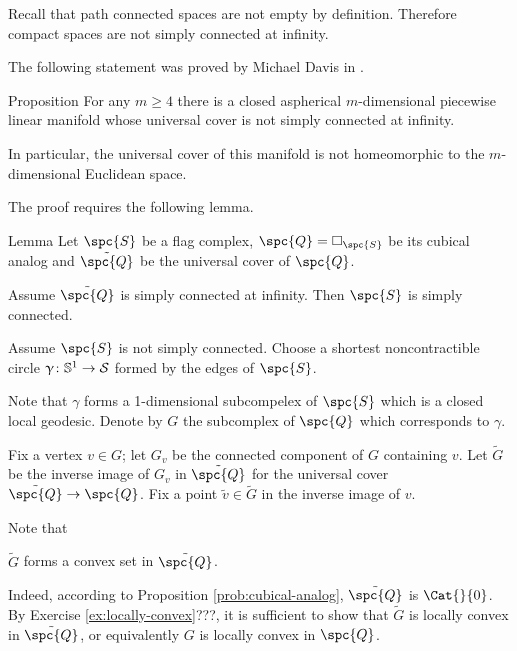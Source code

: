 Recall that path connected spaces are not empty by definition.
Therefore compact spaces are not simply connected at infinity.

The following statement was proved by Michael Davis in \cite{davis-noneuclidean}.

\begin{thm}{Proposition}\label{prop:aspherical}
For any  $m\ge 4$ there is a closed aspherical 
$m$-dimensional piecewise linear manifold
whose universal cover is not simply connected at infinity.

In particular, the universal cover of this manifold 
is not homeomorphic to the $m$-dimensional Euclidean space.
\end{thm}

The proof requires the following lemma.

\begin{thm}{Lemma}\label{lem:example-pi_infty}
Let $\spc{S}$ be a flag complex,
$\spc{Q}=\square_{\spc{S}}$ be its cubical analog
and $\tilde{\spc{Q}}$ be the universal cover of $\spc{Q}$.

Assume  $\tilde{\spc{Q}}$ is simply connected at infinity.
Then $\spc{S}$ is simply connected.
\end{thm}

Assume $\spc{S}$ is not simply connected.
Choose a shortest noncontractible circle $\gamma\:\mathbb{S}^1\to\spc{S}$ formed by the edges of $\spc{S}$.

Note that $\gamma$ forms a 1-dimensional subcompelex of $\spc{S}$ which is a closed local geodesic.
Denote by $G$ the subcomplex of $\spc{Q}$ which corresponds to $\gamma$.

Fix a vertex $v\in G$;
let $G_v$ be the connected component of $G$ containing $v$.
Let $\tilde G$ be 
the inverse image 
of $G_v$ in $\tilde{\spc{Q}}$
for the universal cover $\tilde{\spc{Q}}\to \spc{Q}$.
Fix a point $\tilde v\in\tilde G$ in the inverse image of $v$.
 
Note that 
\begin{clm}{}\label{tilde-G-convex}
$\tilde G$ forms a convex set in $\tilde{\spc{Q}}$.
\end{clm}


Indeed, according to Proposition \ref{prob:cubical-analog},
$\tilde{\spc{Q}}$ is $\Cat{}{0}$.
By Exercise \ref{ex:locally-convex}???,
it is sufficient to show that $\tilde G$ is locally convex in $\tilde{\spc{Q}}$,
or equivalently $G$ is locally convex in $\spc{Q}$.

